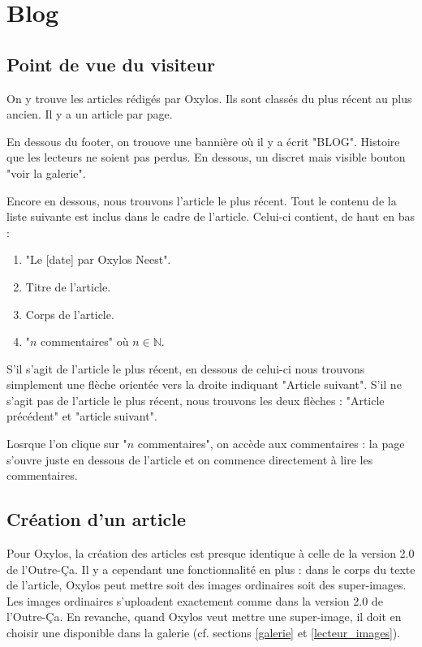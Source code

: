 \documentclass[french]{report}
\theoremstyle{plain}
\begin{document}
	\section{Blog} \label{blog_ox}
		\subsection{Point de vue du visiteur}
			On y trouve les articles rédigés par Oxylos. Ils sont classés du plus récent au plus ancien. Il y a un article par page.

			En dessous du footer, on trouove une bannière où il y a écrit "BLOG". Histoire que les lecteurs ne soient pas perdus. En dessous, un discret mais visible bouton "voir la galerie".

			Encore en dessous, nous trouvons l'article le plus récent. Tout le contenu de la liste suivante est inclus dans le cadre de l'article. Celui-ci contient, de haut en bas :
			\begin{enumerate}
			 	\item "Le [date] par Oxylos Neest".
			 	\item Titre de l'article.
			 	\item Corps de l'article.
			 	\item "$n$ commentaires" où $n\in \mathbb{N}$.
			\end{enumerate} 

			S'il s'agit de l'article le plus récent, en dessous de celui-ci nous trouvons simplement une flèche orientée vers la droite indiquant "Article suivant". S'il ne s'agit pas de l'article le plus récent, nous trouvons les deux flèches : "Article précédent" et "article suivant". 

			Losrque l'on clique sur "$n$ commentaires", on accède aux commentaires : la page s'ouvre juste en dessous de l'article et on commence directement à lire les commentaires.

		\subsection{Création d'un article}
			Pour Oxylos, la création des articles est presque identique à celle de la version 2.0 de l'Outre-Ça. Il y a cependant une fonctionnalité en plus : dans le corps du texte de l'article, Oxylos peut mettre soit des images ordinaires soit des super-images. Les images ordinaires s'uploadent exactement comme dans la version 2.0 de l'Outre-Ça. En revanche, quand Oxylos veut mettre une super-image, il doit en choisir une disponible dans la galerie (cf. sections \ref{galerie} et \ref{lecteur_images}).
\end{document}
